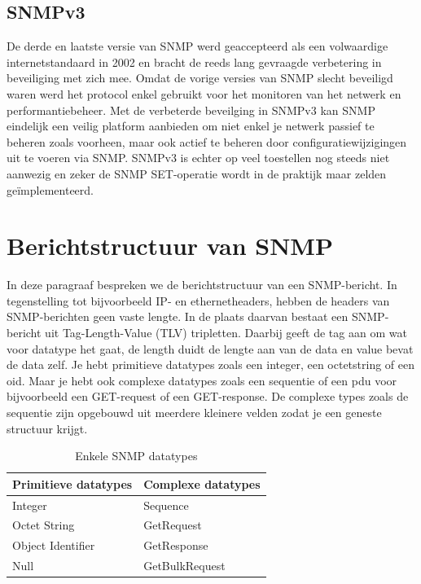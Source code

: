

\subsection{SNMPv3}
De derde en laatste versie van SNMP werd geaccepteerd als een volwaardige internetstandaard in 2002 \cite{snmpv3} en
bracht de reeds lang gevraagde verbetering in beveiliging met zich mee.
Omdat de vorige versies van SNMP slecht beveiligd waren werd het protocol enkel gebruikt voor het monitoren van het netwerk en performantiebeheer.
Met de verbeterde beveilging in SNMPv3 kan SNMP eindelijk een veilig platform aanbieden om niet enkel je netwerk passief te beheren zoals voorheen,
maar ook actief te beheren door configuratiewijzigingen uit te voeren via SNMP.
SNMPv3 is echter op veel toestellen nog steeds niet aanwezig en zeker de SNMP SET-operatie wordt in de praktijk maar zelden geïmplementeerd.

\section{Berichtstructuur van SNMP}
\label{snmp-berichtstructuur}

In deze paragraaf bespreken we de berichtstructuur van een SNMP-bericht.
In tegenstelling tot bijvoorbeeld IP- en ethernetheaders, hebben de headers van SNMP-berichten geen vaste lengte.
In de plaats daarvan bestaat een SNMP-bericht uit Tag-Length-Value (TLV) tripletten\cite{moreau}.
Daarbij geeft de tag aan om wat voor datatype het gaat, de length duidt de lengte aan van de data en value bevat de data zelf.
Je hebt primitieve datatypes zoals een integer, een octetstring of een \gls{oid}.
Maar je hebt ook complexe datatypes zoals een sequentie of een \gls{pdu} voor bijvoorbeeld een GET-request of een GET-response.
De complexe types zoals de sequentie zijn opgebouwd uit meerdere kleinere velden zodat je een geneste structuur krijgt\cite{snmp-message-format}.

\begin{table}[h]
\centering
\begin{tabular}{@{}ll@{}}
\toprule
Primitieve datatypes & Complexe datatypes \\ \midrule
Integer              & Sequence           \\
Octet String         & GetRequest         \\
Object Identifier    & GetResponse        \\
Null                 & GetBulkRequest     \\ \bottomrule
\end{tabular}
\caption{Enkele SNMP datatypes}
\label{tabel-datatypes}
\end{table}

